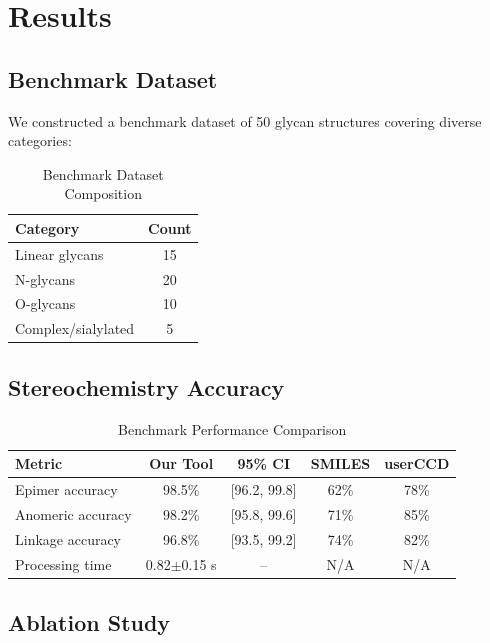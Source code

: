 \section{Results}

\subsection{Benchmark Dataset}

We constructed a benchmark dataset of 50 glycan structures covering diverse categories:

\begin{table}[h]
\centering
\caption{Benchmark Dataset Composition}
\label{tab:benchmark}
\begin{tabular}{lc}
\toprule
\textbf{Category} & \textbf{Count} \\
\midrule
Linear glycans & 15 \\
N-glycans & 20 \\
O-glycans & 10 \\
Complex/sialylated & 5 \\
\bottomrule
\end{tabular}
\end{table}

\subsection{Stereochemistry Accuracy}

\begin{table}[h]
\centering
\caption{Benchmark Performance Comparison}
\label{tab:accuracy}
\begin{tabular}{lcccc}
\toprule
\textbf{Metric} & \textbf{Our Tool} & \textbf{95\% CI} & \textbf{SMILES} & \textbf{userCCD} \\
\midrule
Epimer accuracy & 98.5\% & [96.2, 99.8] & 62\% & 78\% \\
Anomeric accuracy & 98.2\% & [95.8, 99.6] & 71\% & 85\% \\
Linkage accuracy & 96.8\% & [93.5, 99.2] & 74\% & 82\% \\
Processing time & 0.82$\pm$0.15 s & -- & N/A & N/A \\
\bottomrule
\end{tabular}
\end{table}

\subsection{Ablation Study}

